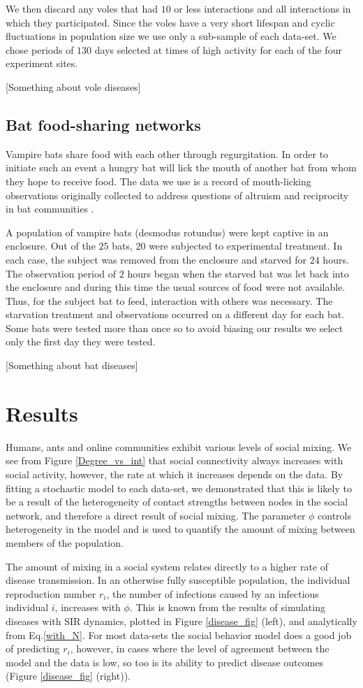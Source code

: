 \documentclass[10pt]{article}
\begin{document}
\begin{multicols}{2}
We then discard any voles that had $10$ or less interactions and all interactions in which they participated. Since the voles have a very short lifespan and cyclic fluctuations in population size we use only a sub-sample of each data-set. We chose periods of $130$ days selected at times of high activity for each of the four experiment sites.

[Something about vole diseases]
\subsection{Bat food-sharing networks}
Vampire bats share food with each other through regurgitation. In order to initiate such an event a hungry bat will lick the mouth of another bat from whom they hope to receive food. The data we use is a record of mouth-licking observations originally collected to address questions of altruism and reciprocity in bat communities \cite{Carter20122573,dryad_tg7b1}.

A population of vampire bats (desmodus rotundus) were kept captive in an enclosure. Out of the $25$ bats, $20$ were subjected to experimental treatment. In each case, the subject was removed from the enclosure and starved for $24$ hours. The observation period of $2$ hours began when the starved bat was let back into the enclosure and during this time the usual sources of food were not available. Thus, for the subject bat to feed, interaction with others was necessary. The starvation treatment and observations occurred on a different day for each bat. Some bats were tested more than once so to avoid biasing our results we select only the first day they were tested. 

[Something about bat diseases]
\section{Results} 
Humans, ants and online communities exhibit various levels of social mixing. We see from Figure \ref{Degree_vs_int} that social connectivity always increases with social activity, however, the rate at which it  increases depends on the data. By fitting a stochastic model to each data-set, we demonstrated that this is likely to be a result of the heterogeneity of contact strengths between nodes in the social network, and therefore a direct result of social mixing. The parameter $\phi$ controls heterogeneity in the model and is used to quantify the amount of mixing between members of the population.

The amount of mixing in a social system relates directly to a higher rate of disease transmission. In an otherwise fully susceptible population, the individual reproduction number $r_{i}$, the number of infections caused by an infectious individual $i$, increases with $\phi$. This is known from the results of simulating diseases with SIR dynamics, plotted in Figure \ref{disease_fig} (left), and analytically from Eq.\eqref{with_N}. For most data-sets the social behavior model does a good job of predicting $r_{i}$, however, in cases where the level of agreement between the model and the data is low, so too is its ability to predict disease outcomes (Figure \ref{disease_fig} (right)).


\end{multicols}
\end{document}
